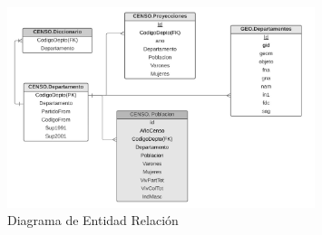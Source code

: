\documentclass{article}
\theoremstyle{mytheoremstyle}
\theoremstyle{mytheoremstyle}
\theoremstyle{myproblemstyle}
\begin{document}
\begin{figure}[htbp]
    \centering
    \includegraphics[width=0.8\textwidth]{img/DER.jpg}
    \caption{Diagrama de Entidad Relación}
    \label{fig:DER}
\end{figure}
\end{document}
